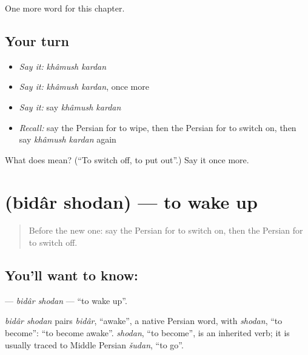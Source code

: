\begin{grammarlens}[title={What you've built}]
One more word for this chapter.
\end{grammarlens}

\subsection*{Your turn}
\begin{itemize}
\raggedright
  \item \emph{Say it:} \emph{khâmush kardan}
  \item \emph{Say it:} \emph{khâmush kardan}, once more
  \item \emph{Say it:} say \emph{khâmush kardan}
  \item \emph{Recall:} say the Persian for to wipe, then the Persian for to switch on, then say \emph{khâmush kardan} again
\end{itemize}

\begin{tcolorbox}[breakable,colback=teal!4,colframe=teal!35!black,title={Before you move on}]
What does   mean? (\textquotedblleft{}To switch off, to put out\textquotedblright{}.) Say it once more.
\end{tcolorbox}
\section[\texorpdfstring{\fa{بیدار} \fa{شدن} (bidâr shodan)}{بیدار شدن (bidâr shodan)}]{  (bidâr shodan) — to wake up}

\label{lesson:FA-C140-bidar-shodan}



\begin{quote}
Before the new one: say the Persian for to switch on, then the Persian for to switch off.
\end{quote}

\subsection*{You'll want to know:  }
\textbf{ } — \emph{bidâr shodan} — \textquotedblleft{}to wake up\textquotedblright{}.

\begin{cousinweb}
\emph{bidâr shodan} pairs \emph{bidâr}, \textquotedblleft{}awake\textquotedblright{}, a native Persian word, with \emph{shodan}, \textquotedblleft{}to become\textquotedblright{}: \textquotedblleft{}to become awake\textquotedblright{}. \emph{shodan}, \textquotedblleft{}to become\textquotedblright{}, is an inherited verb; it is usually traced to Middle Persian \emph{šudan}, \textquotedblleft{}to go\textquotedblright{}.
\end{cousinweb}

